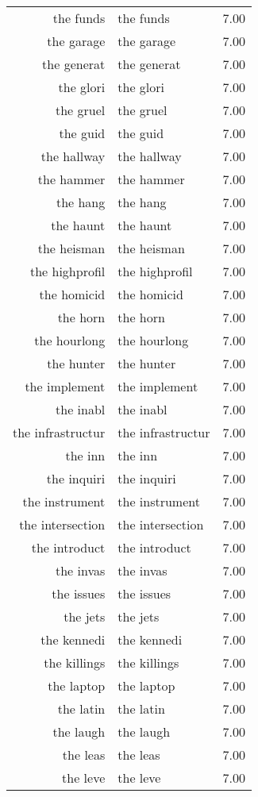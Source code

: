 \begin{table}[ht]
\begin{tabular}{rlr}
  the funds & the funds & 7.00 \\ 
  the garage & the garage & 7.00 \\ 
  the generat & the generat & 7.00 \\ 
  the glori & the glori & 7.00 \\ 
  the gruel & the gruel & 7.00 \\ 
  the guid & the guid & 7.00 \\ 
  the hallway & the hallway & 7.00 \\ 
  the hammer & the hammer & 7.00 \\ 
  the hang & the hang & 7.00 \\ 
  the haunt & the haunt & 7.00 \\ 
  the heisman & the heisman & 7.00 \\ 
  the highprofil & the highprofil & 7.00 \\ 
  the homicid & the homicid & 7.00 \\ 
  the horn & the horn & 7.00 \\ 
  the hourlong & the hourlong & 7.00 \\ 
  the hunter & the hunter & 7.00 \\ 
  the implement & the implement & 7.00 \\ 
  the inabl & the inabl & 7.00 \\ 
  the infrastructur & the infrastructur & 7.00 \\ 
  the inn & the inn & 7.00 \\ 
  the inquiri & the inquiri & 7.00 \\ 
  the instrument & the instrument & 7.00 \\ 
  the intersection & the intersection & 7.00 \\ 
  the introduct & the introduct & 7.00 \\ 
  the invas & the invas & 7.00 \\ 
  the issues & the issues & 7.00 \\ 
  the jets & the jets & 7.00 \\ 
  the kennedi & the kennedi & 7.00 \\ 
  the killings & the killings & 7.00 \\ 
  the laptop & the laptop & 7.00 \\ 
  the latin & the latin & 7.00 \\ 
  the laugh & the laugh & 7.00 \\ 
  the leas & the leas & 7.00 \\ 
  the leve & the leve & 7.00 \\ 

\end{tabular}
\end{table}

